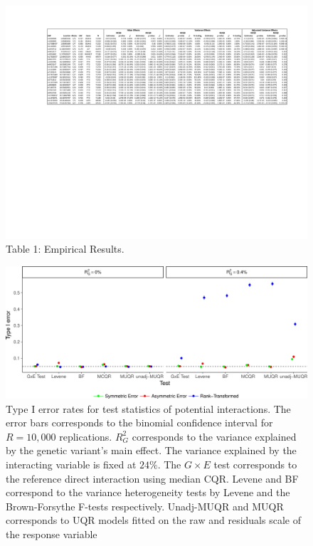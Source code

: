 \documentclass[12pt]{article}
\begin{document}
\newpage
\begin{landscape}
	\centering
	\begin{figure} 
		\centering
		\includegraphics[width=1 \textwidth, height=0.55\textwidth]{Figures/Table_1.pdf}
		\caption{Table 1: Empirical Results.}
		\label{fig:Table_1_EmpiricalResults}
	\end{figure}
\end{landscape}

\newpage
\begin{landscape}
	\centering
	\begin{figure}[h!]
		\centering
		\includegraphics[width=1 \textwidth, height=0.55\textwidth]{Figures/FP_R004_2.jpg}
		\caption{Type I error rates for test statistics of potential interactions. The error bars corresponds to the binomial confidence interval for $R=10,000$ replications. $R^{2}_G$ corresponds to the variance explained by the genetic variant's main effect. The variance explained by the interacting variable is fixed at $24\%$. The $G\times E$ test corresponds to the reference direct interaction using median CQR. Levene and BF correspond to the variance heterogeneity tests by Levene and the Brown-Forsythe F-tests respectively. Unadj-MUQR and MUQR corresponds to UQR models fitted on the raw and residuals scale of the response variable}
		\label{fig:FP}
	\end{figure}
\end{landscape}
\end{document}
